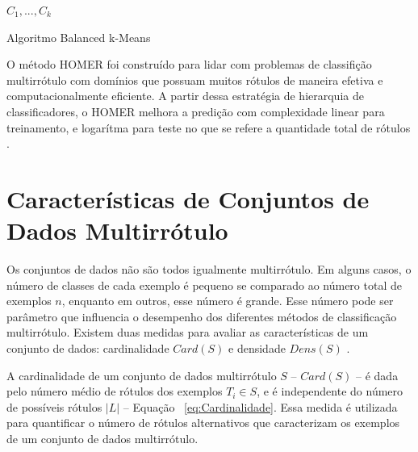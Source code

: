 \IncMargin{1em}
\begin{algorithm}[H]
\SetAlgoLined
{}
\Return $C_1,...,C_k$\;
\caption{Algoritmo Balanced k-Means}
\end{algorithm}
\DecMargin{1em}

\newpage

O método HOMER foi construído para lidar com problemas de classifição multirrótulo com domínios que possuam muitos rótulos de maneira efetiva e computacionalmente eficiente. A partir dessa estratégia de hierarquia de classificadores, o HOMER melhora a predição com complexidade linear para treinamento, e logarítma para teste no que se refere a quantidade total de rótulos \cite{tsoumakas2008effective}.


\section {Características de Conjuntos de Dados Multirrótulo}

Os conjuntos de dados não são todos igualmente multirrótulo. Em alguns casos, o número de classes de cada exemplo é pequeno se comparado ao número total de exemplos $n$, enquanto em outros, esse número é grande. Esse número pode ser parâmetro que influencia o desempenho dos diferentes métodos de classificação multirrótulo. Existem duas medidas para avaliar as características de um conjunto de dados: cardinalidade $Card(S)$ e densidade $Dens(S)$ \cite{tsoumakas2010mining}.

A cardinalidade de um conjunto de dados multirrótulo $S$ – $Card(S)$ – é dada pelo número médio de rótulos dos exemplos $T_i \in S$, e é independente do número de possíveis rótulos $|L|$ – Equação  ~\ref{eq:Cardinalidade}. Essa medida é utilizada para quantificar o número de rótulos alternativos que caracterizam os exemplos de um conjunto de dados multirrótulo.
        
